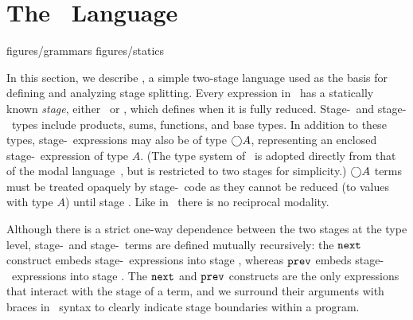 \section{The \lang\ Language}

 {figures/grammars}
 {figures/statics}

In this section, we describe \lang, a simple two-stage language
used as the basis for defining and analyzing stage splitting.
Every expression in \lang\ has a statically known {\em stage},
either \bbone~or \bbtwo, which defines when it is fully reduced.
%
Stage-\bbone\ and stage-\bbtwo\ types include products, sums, functions, and base types.
In addition to these types, stage-\bbone\ expressions may also be of type $\bigcirc A$,
representing an enclosed stage-\bbtwo\ expression of type $A$.
(The type system of \lang\ is adopted directly from that of the modal language \lamCircle\,\cite{davies96}, but is restricted to two stages for simplicity.) $\bigcirc A$ terms must be treated opaquely by stage-\bbone\ code
as they cannot be reduced (to values with type $A$) until stage \bbtwo. Like in \lamCircle\, there is no reciprocal modality.

Although there is a strict one-way dependence between the two stages at the type
level, stage-\bbone\ and stage-\bbtwo\ terms are defined mutually recursively:
the ${\tt next}$ construct embeds stage-\bbtwo\ expressions into stage \bbone,
whereas ${\tt prev}$ embeds stage-\bbone\ expressions into stage \bbtwo.
The ${\tt next}$ and ${\tt prev}$ constructs are the only expressions that interact with the stage of a term,
and we surround their arguments with braces in \lang\ syntax to clearly indicate stage boundaries within a program.


